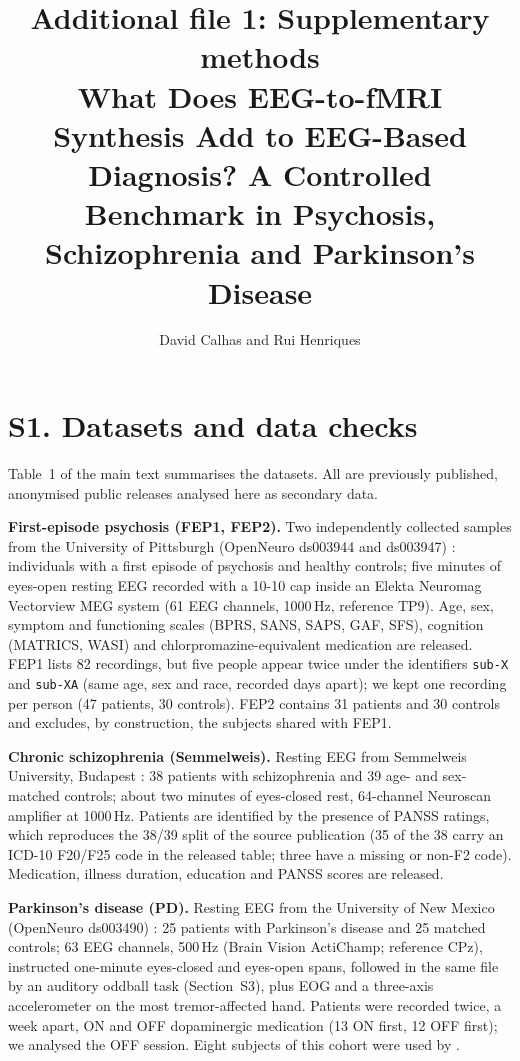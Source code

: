 \documentclass[10pt]{article}
\title{Additional file 1: Supplementary methods\\[4pt]\large What Does EEG-to-fMRI Synthesis Add to EEG-Based Diagnosis? A Controlled Benchmark in Psychosis, Schizophrenia and Parkinson's Disease}
\author{\normalsize David Calhas and Rui Henriques}
\date{}
\begin{document}
\maketitle

\section*{S1. Datasets and data checks}

Table~1 of the main text summarises the datasets. All are previously published, anonymised public releases analysed here as secondary data.

\noindent\textbf{First-episode psychosis (FEP1, FEP2).} Two independently collected samples from the University of Pittsburgh (OpenNeuro ds003944 and ds003947) \cite{salisbury_ds003944,salisbury_ds003947}: individuals with a first episode of psychosis and healthy controls; five minutes of eyes-open resting EEG recorded with a 10-10 cap inside an Elekta Neuromag Vectorview MEG system (61 EEG channels, 1000\,Hz, reference TP9). Age, sex, symptom and functioning scales (BPRS, SANS, SAPS, GAF, SFS), cognition (MATRICS, WASI) and chlorpromazine-equivalent medication are released. FEP1 lists 82 recordings, but five people appear twice under the identifiers \texttt{sub-X} and \texttt{sub-XA} (same age, sex and race, recorded days apart); we kept one recording per person (47 patients, 30 controls). FEP2 contains 31 patients and 30 controls and excludes, by construction, the subjects shared with FEP1.

\noindent\textbf{Chronic schizophrenia (Semmelweis).} Resting EEG from Semmelweis University, Budapest \cite{racz2025}: 38 patients with schizophrenia and 39 age- and sex-matched controls; about two minutes of eyes-closed rest, 64-channel Neuroscan amplifier at 1000\,Hz. Patients are identified by the presence of PANSS ratings, which reproduces the 38/39 split of the source publication (35 of the 38 carry an ICD-10 F20/F25 code in the released table; three have a missing or non-F2 code). Medication, illness duration, education and PANSS scores are released.

\noindent\textbf{Parkinson's disease (PD).} Resting EEG from the University of New Mexico (OpenNeuro ds003490) \cite{cavanagh_ds003490}: 25 patients with Parkinson's disease and 25 matched controls; 63 EEG channels, 500\,Hz (Brain Vision ActiChamp; reference CPz), instructed one-minute eyes-closed and eyes-open spans, followed in the same file by an auditory oddball task (Section~S3), plus EOG and a three-axis accelerometer on the most tremor-affected hand. Patients were recorded twice, a week apart, ON and OFF dopaminergic medication (13 ON first, 12 OFF first); we analysed the OFF session. Eight subjects of this cohort were used by \cite{yao2025catd}.
\end{document}
